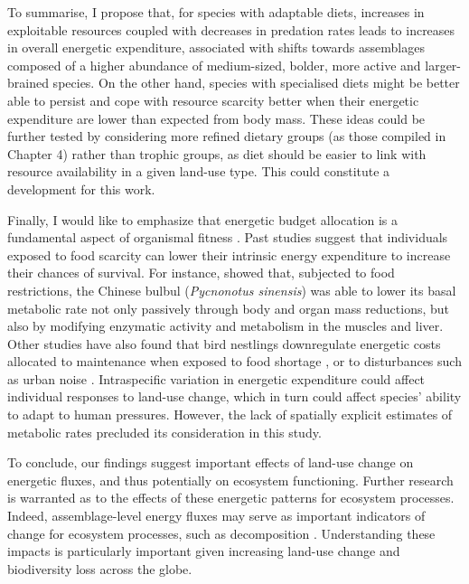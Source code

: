 To summarise, I propose that, for species with adaptable diets, increases in exploitable resources coupled with decreases in predation rates leads to increases in overall energetic expenditure, associated with shifts towards assemblages composed of a higher abundance of medium-sized, bolder, more active and larger- brained species. On the other hand, species with specialised diets might be better able to persist and cope with resource scarcity better when their energetic expenditure are lower than expected from body mass. These ideas could be further tested by considering more refined dietary groups (as those compiled in Chapter 4) rather than trophic groups, as diet should be easier to link with resource availability in a given land-use type. This could constitute a development for this work. 

Finally, I would like to emphasize that energetic budget allocation is a fundamental aspect of organismal fitness \citep{RobertBurger2021}. Past studies suggest that individuals exposed to food scarcity can lower their intrinsic energy expenditure to increase their chances of survival. For instance, \citet{Zhang2018a} showed that, subjected to food restrictions, the Chinese bulbul (\textit{Pycnonotus sinensis}) was able to lower its basal metabolic rate not only passively through body and organ mass reductions, but also by modifying enzymatic activity and metabolism in the muscles and liver. Other studies have also found that bird nestlings downregulate energetic costs allocated to maintenance when exposed to food shortage \citep{Brzek2001, Moe2004}, or to disturbances such as urban noise \citep{Brischoux2017}. Intraspecific variation in energetic expenditure could affect individual responses to land-use change, which in turn could affect species’ ability to adapt to human pressures. However, the lack of spatially explicit estimates of metabolic rates precluded its consideration in this study.

To conclude, our findings suggest important effects of land-use change on energetic fluxes, and thus potentially on ecosystem functioning. Further research is warranted as to the effects of these energetic patterns for ecosystem processes. Indeed, assemblage-level energy fluxes may serve as important indicators of change for ecosystem processes, such as decomposition \citep{Barnes2014}. Understanding these impacts is particularly important given increasing land-use change and biodiversity loss across the globe.